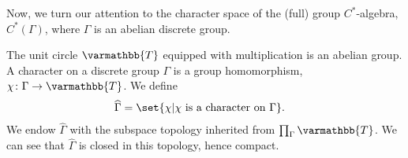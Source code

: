 \documentclass[10pt]{mypackage}
\renewcommand*{\mathbb}[1]{\varmathbb{#1}}
\newcommand{\T}{\mathbb{T}}
\begin{document}
\begin{example}
  Now, we turn our attention to the character space of the (full) group $C^{\ast}$-algebra, $C^{\ast}\left(\Gamma\right)$, where $\Gamma$ is an abelian discrete group.\newline

  The unit circle $\T$ equipped with multiplication is an abelian group. A character on a discrete group $\Gamma$ is a group homomorphism, $\chi\colon \Gamma\rightarrow \T$. We define
  \begin{align*}
    \widehat{\Gamma} &= \set{\chi | \chi\text{ is a character on }\Gamma}.
  \end{align*}
  We endow $\widehat{\Gamma}$ with the subspace topology inherited from $\prod_{\Gamma}\T$. We can see that $\widehat{\Gamma}$ is closed in this topology, hence compact.\newline


\end{example}
\end{document}
